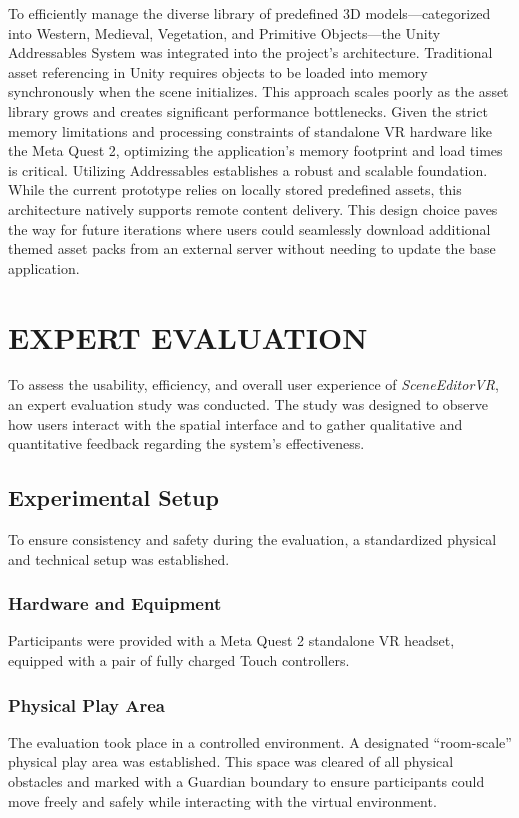 \documentclass[inscr,ack,preface]{dithesis}
\begin{document}
To efficiently manage the diverse library of predefined 3D models—categorized into Western, Medieval, Vegetation,
and Primitive Objects—the Unity Addressables System was integrated into the project's architecture.
Traditional asset referencing in Unity requires objects to be loaded into memory synchronously when the scene initializes.
This approach scales poorly as the asset library grows and creates significant performance bottlenecks.
Given the strict memory limitations and processing constraints of standalone VR hardware like the Meta Quest 2,
optimizing the application's memory footprint and load times is critical. Utilizing Addressables establishes a
robust and scalable foundation. While the current prototype relies on locally stored predefined assets, this architecture natively supports
remote content delivery. This design choice paves the way for future iterations where users could seamlessly download
additional themed asset packs from an external server without needing to update the base application.

\chapter{EXPERT EVALUATION}
To assess the usability, efficiency, and overall user experience of \textit{SceneEditorVR}, an expert evaluation study was conducted.
The study was designed to observe how users interact with the spatial interface and to gather qualitative and quantitative feedback regarding
the system's effectiveness.


\section{Experimental Setup}

To ensure consistency and safety during the evaluation, a standardized physical and technical setup was established.

\subsection{Hardware and Equipment}
Participants were provided with a Meta Quest 2 standalone VR headset, equipped with a pair of fully charged Touch controllers.
\subsection{Physical Play Area}
The evaluation took place in a controlled environment.
A designated ``room-scale'' physical play area was established.
This space was cleared of all physical obstacles and marked with a Guardian boundary to ensure participants could move freely
and safely while interacting with the virtual environment.
\end{document}
